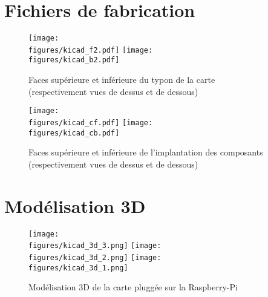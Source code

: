 \section{Fichiers de fabrication}

\begin{figure}[H]
    \centering
    \texttt{[image: \\figures/kicad\_f2.pdf]}
    \texttt{[image: \\figures/kicad\_b2.pdf]}
    \decoRule
    \caption[
    Faces supérieure et inférieure du typon de la carte\\(respectivement vues de dessus et de dessous)]{
    Faces supérieure et inférieure du typon de la carte\\(respectivement vues de dessus et de dessous)}
    \label{fig:Faces supérieure et inférieure du typon de la carte (respectivement vues de dessus et de dessous)}
    \end{figure}

\begin{figure}[H]
    \centering
    \texttt{[image: \\figures/kicad\_cf.pdf]}
    \texttt{[image: \\figures/kicad\_cb.pdf]}
    \decoRule
    \caption[
    Faces supérieure et inférieure de l'implantation des composants\\(respectivement vues de dessus et de dessous)]{
    Faces supérieure et inférieure de l'implantation des composants\\(respectivement vues de dessus et de dessous)}
    \label{fig:Faces supérieure et inférieure de l'implantation des composants (respectivement vues de dessus et de dessous)}
    \end{figure}

\section{Modélisation 3D}

\begin{figure}[H]
    \centering
    \texttt{[image: \\figures/kicad\_3d\_3.png]}
    \texttt{[image: \\figures/kicad\_3d\_2.png]}
    \texttt{[image: \\figures/kicad\_3d\_1.png]}
    \decoRule
    \caption[
    Modélisation 3D de la carte pluggée sur la Raspberry-Pi]{
    Modélisation 3D de la carte pluggée sur la Raspberry-Pi}
    \label{fig:Modélisation 3D de la carte pluggée sur la Raspberry-Pi}
    \end{figure}

\vspace{1cm}

